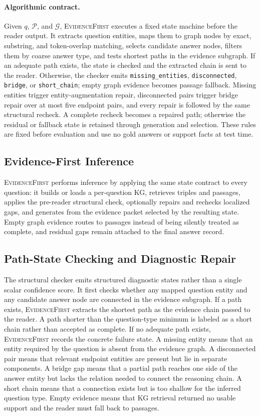 \documentclass[runningheads,a4paper]{llncs}
\newcommand{\sys}{\textsc{EvidenceFirst}\xspace}
\newcommand{\calG}{\mathcal{G}}
\newcommand{\calP}{\mathcal{P}}
\begin{document}
\paragraph{Algorithmic contract.}
Given $q$, $\calP$, and $\calG$, \sys executes a fixed state machine before the
reader output. It extracts question entities, maps them to graph nodes by exact,
substring, and token-overlap matching, selects candidate answer nodes, filters
them by coarse answer type, and tests shortest paths in the evidence subgraph.
If an adequate path exists, the state is checked and the extracted chain is sent
to the reader. Otherwise, the checker emits \texttt{missing\_entities},
\texttt{disconnected}, \texttt{bridge}, or \texttt{short\_chain}; empty graph
evidence becomes passage fallback. Missing entities trigger entity-augmentation repair,
disconnected pairs trigger bridge repair over at most five endpoint pairs,
and every repair is followed by the same structural recheck. A complete recheck
becomes a repaired path; otherwise the residual or fallback state is retained
through generation and selection. These rules are fixed before evaluation and
use no gold answers or support facts at test time.

\subsection{Evidence-First Inference}

\sys performs inference by applying the same state contract to every question:
it builds or loads a per-question KG, retrieves triples and passages, applies the
pre-reader structural check, optionally repairs and rechecks localized gaps, and
generates from the evidence packet selected by the resulting state. Empty graph
evidence routes to passages instead of being silently treated as complete, and
residual gaps remain attached to the final answer record.

\subsection{Path-State Checking and Diagnostic Repair}

The structural checker emits structured diagnostic states rather than a single scalar
confidence score. It first checks whether any mapped question entity and any
candidate answer node are connected in the evidence subgraph. If a path exists,
\sys extracts the shortest path as the evidence chain passed to the reader. A
path shorter than the question-type minimum is labeled as a short chain rather
than accepted as complete. If no adequate path exists, \sys records the concrete
failure state. A missing entity means that an entity required by the question is
absent from the evidence graph. A disconnected pair means that relevant endpoint
entities are present but lie in separate components. A bridge gap means that a
partial path reaches one side of the answer entity but lacks the relation needed
to connect the reasoning chain. A short chain means that a connection exists but
is too shallow for the inferred question type. Empty evidence means that KG
retrieval returned no usable support and the reader must fall back to passages.
\end{document}
